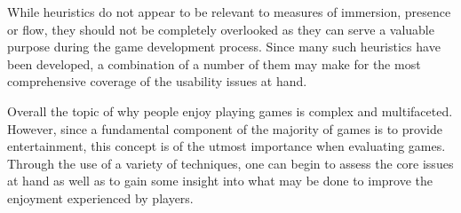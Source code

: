 While heuristics do not appear to be relevant to measures of immersion, presence or flow, they should not be completely overlooked as they can serve a valuable purpose during the game development process. Since many such heuristics have been developed, a combination of a number of them may make for the most comprehensive coverage of the usability issues at hand.

Overall the topic of why people enjoy playing games is complex and multifaceted. However, since a fundamental component of the majority of games is to provide entertainment, this concept is of the utmost importance when evaluating games. Through the use of a variety of techniques, one can begin to assess the core issues at hand as well as to gain some insight into what may be done to improve the enjoyment experienced by players.



